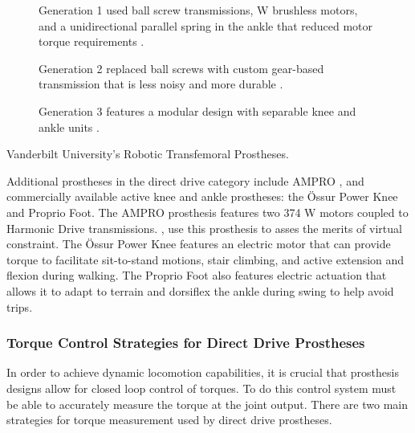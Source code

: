 \begin{marginfigure}
    \centering
	\begin{subfigure}[t]{\linewidth}
    	\centering
        \caption{Generation 1 used ball screw transmissions, \unit[200]{W}
        brushless motors, and a unidirectional parallel spring in the ankle that
        reduced motor torque requirements \citep{sup2009preliminary}.}
        \label{fig:vanderbilt_gen_1}
	\end{subfigure}

	\begin{subfigure}[t]{\linewidth}
    	\centering
        \caption{Generation 2 replaced ball screws with custom gear-based
        transmission that is less noisy and more durable
        \citep{lawson2013control}.}
	\end{subfigure}

	\begin{subfigure}[t]{\linewidth}
    	\centering
        \caption{Generation 3 features a modular design with separable knee and
        ankle units \citep{lawson2014robotic}.}
	\end{subfigure}
    \caption{Vanderbilt University's Robotic Transfemoral Prostheses.}
    \label{fig:vanderbilt_prostheses}
\end{marginfigure}

Additional prostheses in the direct drive category include AMPRO
\citep{zhao2016first}, and commercially available active knee and ankle
prostheses: the Össur Power Knee and Proprio Foot. The AMPRO prosthesis features
two 374 W motors coupled to Harmonic Drive transmissions.
\citet{zhao2016first}, use this prosthesis to asses the merits of virtual
constraint. The Össur Power Knee features an electric motor that can provide
torque to facilitate sit-to-stand motions, stair climbing, and active extension
and flexion during walking. The Proprio Foot also features electric actuation
that allows it to adapt to terrain and dorsiflex the ankle during swing to help
avoid trips. 

\subsubsection{Torque Control Strategies for Direct Drive Prostheses}
In order to achieve dynamic locomotion capabilities, it is crucial that
prosthesis designs allow for closed loop control of torques. To do this control
system must be able to accurately measure the torque at the joint output. There
are two main strategies for torque measurement used by direct drive prostheses.


